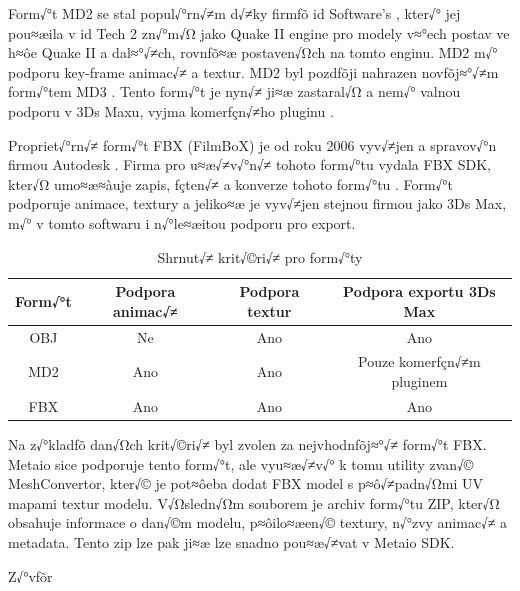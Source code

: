\documentclass[twoside,12pt]{article}
\begin{document}
Form√°t MD2 se stal popul√°rn√≠m d√≠ky firmƒõ id Software's \cite{md2_wiki}, kter√° jej pou≈æila v id Tech 2 zn√°m√Ω jako Quake II engine \cite{quake_engine} pro modely v≈°ech postav ve h≈ôe Quake II a dal≈°√≠ch, rovnƒõ≈æ postaven√Ωch na tomto enginu. MD2 m√° podporu key-frame animac√≠ a textur. MD2 byl pozdƒõji nahrazen novƒõj≈°√≠m form√°tem MD3 \cite{id_tech_3_wiki}. Tento form√°t je nyn√≠ ji≈æ zastaral√Ω a nem√° valnou podporu v 3Ds Maxu, vyjma komerƒçn√≠ho pluginu \cite{qtip_plugin}. 

Propriet√°rn√≠ form√°t FBX (FilmBoX) je od roku 2006 vyv√≠jen a spravov√°n firmou Autodesk \cite{autodesk_fbx}. Firma pro u≈æ√≠v√°n√≠ tohoto form√°tu vydala FBX SDK, kter√Ω umo≈æ≈àuje zapis, ƒçten√≠ a konverze tohoto form√°tu \cite{autodesk_fbx_sdk}. Form√°t podporuje animace, textury a jeliko≈æ je vyv√≠jen stejnou firmou jako 3Ds Max, m√° v tomto softwaru i n√°le≈æitou podporu pro export.


\begin{table}[H]
\centering
\begin{tabular}{|c|c|c|c|}
\hline
Form√°t & Podpora animac√≠ & Podpora textur & Podpora exportu 3Ds Max  \\ \hline
OBJ    & Ne              & Ano            & Ano                      \\ \hline
MD2    & Ano             & Ano            & Pouze komerƒçn√≠m pluginem \\ \hline
FBX    & Ano             & Ano            & Ano                      \\ \hline
\end{tabular}
\caption{Shrnut√≠ krit√©ri√≠ pro form√°ty}
\end{table}


Na z√°kladƒõ dan√Ωch krit√©ri√≠ byl zvolen za nejvhodnƒõj≈°√≠ form√°t FBX. Metaio sice podporuje tento form√°t, ale vyu≈æ√≠v√° k tomu utility zvan√© MeshConvertor, kter√© je pot≈ôeba dodat FBX model s p≈ô√≠padn√Ωmi UV mapami textur modelu. V√Ωsledn√Ωm souborem je archiv form√°tu ZIP, kter√Ω obsahuje informace o dan√©m modelu, p≈ôilo≈æen√© textury, n√°zvy animac√≠ a metadata. Tento zip lze pak ji≈æ lze snadno pou≈æ√≠vat v Metaio SDK.


% 
\newpage


% 
\newpage

%
%
Z√°vƒõr

%
\end{document}
